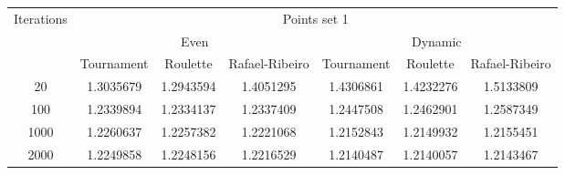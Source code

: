 \begin{center}
	\begin{tabular}{|c|c|c|c|c|c|c|}
		\hline
		\multirow{3}{*}{Iterations}	&	\multicolumn{6}{c|}{Points set 1}	\\
										\cline{2-7}
									&	\multicolumn{3}{c|}{Even}	& \multicolumn{3}{c|}{Dynamic} \\
										\cline{2-7}
									&	Tournament		&	Roulette		&	Rafael-Ribeiro	&	Tournament		&	Roulette		&	Rafael-Ribeiro		\\
		\hline
		20							&	1.3035679		& 	1.2943594		&	1.4051295		&	1.4306861		&	1.4232276		&	1.5133809			\\
		\hline
		100							&	1.2339894		&	1.2334137		&	1.2337409		&	1.2447508		&	1.2462901		&	1.2587349			\\
		\hline
		1000						&	1.2260637		&	1.2257382		&	1.2221068		&	1.2152843		&	1.2149932		&	1.2155451			\\
		\hline
		2000						&	1.2249858		&	1.2248156		&	1.2216529		&	1.2140487		&	1.2140057		&	1.2143467			\\
		\hline
	\end{tabular}
	\label{tab:selection_type}
\end{center}
